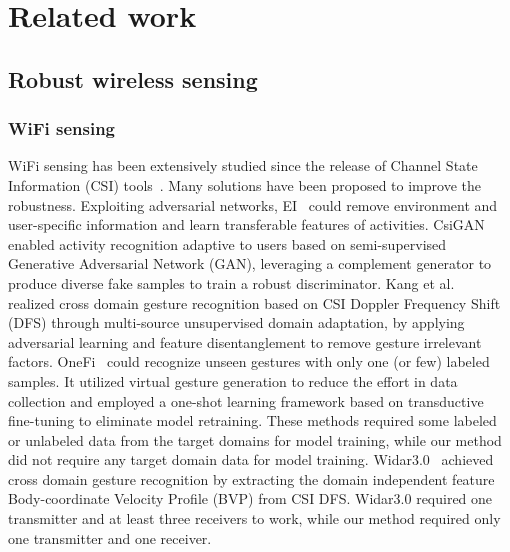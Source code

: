 \section{Related work}
\label{SecRelatedWork}

\subsection{Robust wireless sensing}
\subsubsection{WiFi sensing}
WiFi sensing has been extensively studied since the release of Channel State Information (CSI) tools~\cite{Halperin:2010,XieY:2015}. Many solutions have been proposed to improve the robustness. 
Exploiting adversarial networks, EI~\cite{JiangWJ:2018} could remove environment and user-specific information and learn transferable features of activities. 
CsiGAN~\cite{XiaoCJ:2019} enabled activity recognition adaptive to users based on semi-supervised Generative Adversarial Network (GAN), leveraging a complement generator to produce diverse fake samples to train a robust discriminator.
Kang et al.~\cite{KangH:2021} realized cross domain gesture recognition based on CSI Doppler Frequency Shift (DFS) through multi-source unsupervised domain adaptation, by applying adversarial learning and feature disentanglement to remove gesture irrelevant factors. 
OneFi~\cite{XiaoR:2021} could recognize unseen gestures with only one (or few) labeled samples. It utilized virtual gesture generation to reduce the effort in data collection and employed a one-shot learning framework based on transductive fine-tuning to eliminate model retraining. 
These methods required some labeled or unlabeled data from the target domains for model training, while our method did not require any target domain data for model training.
Widar3.0~\cite{ZhangY:2022} achieved cross domain gesture recognition by extracting the domain independent feature Body-coordinate Velocity Profile (BVP) from CSI DFS. Widar3.0 required one transmitter and at least three receivers to work, while our method required only one transmitter and one receiver.  

